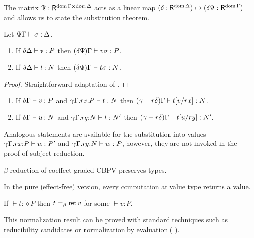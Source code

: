 \documentclass[acmsmall,review,anonymous]{acmart}\settopmatter{printfolios=true,printccs=false,printacmref=false}
\newtheorem{remark}{Remark}
\begin{document}
The matrix $\Psi : \R^{\dom \Gamma \times \dom \Delta}$ acts as a
linear map
$(\delta : \R^{\dom \Delta}) \mapsto (\delta\Psi : \R^{\dom \Gamma})$
and allows us to state the substitution theorem.
\begin{theorem}
  Let $\SubstTy \Psi \Gamma \sigma \Delta$.
  \begin{enumerate}
  \item If $\qValTy \delta \Delta v P$ then $\pValTy {\delta\Psi} \Gamma {v\sigma} P$.
  \item If $\qCompTy \delta \Delta t N$ then
    $\pCompTy {\delta\Psi} \Gamma {t\sigma} N$.
  \end{enumerate}
\end{theorem}
\begin{proof}
  Straightforward adaptation of \citet{atkeyWood:types19}.
\end{proof}
\begin{corollary}
  \label{cor:tysinglesub}
  \bla
  \begin{enumerate}
  \item If $\qValTy \delta \Gamma v P$ and
      $\oCompTy {\qext \gamma \Gamma r x P} t {N}$
      then $\pCompTy {\gamma + r\delta} \Gamma {\qsubst v r x t} {N}$.
  \item If $\qCompTy \delta \Gamma u N$ and
      $\oCompTy {\qext \gamma \Gamma r y N} t {N'}$
      then $\pCompTy {\gamma + r\delta} \Gamma {\qsubst u r y t} {N'}$.
  \end{enumerate}
\end{corollary}
Analogous statements are available for the substitution into values
$\ValTy {\qext \gamma \Gamma r x P} w {P'}$ and
$\ValTy {\qext \gamma \Gamma r y N} w {P}$, however, they are not
invoked in the proof of subject reduction.
\begin{corollary}
  $\beta$-reduction of coeffect-graded CBPV preserves types.
\end{corollary}
In the pure (effect-free) version, every computation at value type
returns a value.
\begin{conjecture}
  If $\vdash t : \diamond P$ then $t =_{\beta} \ret v$ for some $\vdash v : P$.
\end{conjecture}
This normalization result can be proved with standard techniques such
as reducibility candidates or normalization by evaluation (\cf
\citet{abelSattler:ppdp19}).
\end{document}
